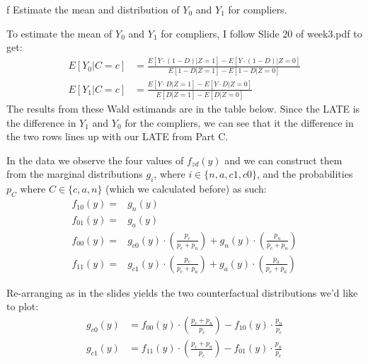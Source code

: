 \documentclass{article}
\begin{document}
\begin{problem}{f}
Estimate the mean and distribution of $Y_{0}$ and $Y_{1}$ for compliers.
\end{problem}
\begin{solution}
To estimate the mean of $Y_0$ and $Y_1$ for compliers, I follow Slide 20 of week3.pdf to get:
\begin{align*}
    E[Y_0|C=c] &= \frac{ E[ Y \cdot (1-D) | Z=1] - E[Y \cdot (1-D) | Z=0] }{ E[1-D|Z=1]-E[1-D|Z=0] } \\
    E[Y_1|C=c] &= \frac{ E[ Y \cdot D | Z=1] - E[Y \cdot D | Z=0] }{ E[D|Z=1]-E[D|Z=0] }
\end{align*}
The results from these Wald estimands are in the table below. Since the LATE is the difference in $Y_1$ and $Y_0$ for the compliers, we can see that it the difference in the two rows lines up with our LATE from Part C.

In the data we observe the four values of $f_{zd}(y)$ and we can construct them from the marginal distributions $g_i$, where $i \in \{n,a,c1,c0\}$, and the probabilities $p_C$ where $C \in \{c,a,n \}$ (which we calculated before) as such:
\begin{align*}
    f_{10}(y)=& g_{n}(y) \\
    f_{01}(y)=& g_{a}(y) \\
    f_{00}(y)=& g_{c0}(y) \cdot \left(\frac{p_{c}}{p_{c}+p_{n}}\right) 
        + g_{n}(y) \cdot \left( \frac{p_{n}}{p_{c}+p_{n}} \right) \\
    f_{11}(y)=& g_{c 1}(y) \cdot \left(\frac{p_{c}}{p_{c}+p_{a}} \right) 
        + g_{a}(y) \cdot \left(\frac{p_{a}}{p_{c}+p_{a}} \right)
\end{align*}

Re-arranging as in the slides yields the two counterfactual distributions we'd like to plot:
\begin{align*}
    g_{c0}(y) &= f_{00}(y) \cdot \left(\frac{p_{c}+p_{n}}{p_{c}}\right) - f_{10}(y) \cdot \frac{p_{n}}{p_{c}} \\
    g_{c1}(y) &= f_{11}(y) \cdot \left(\frac{p_{c}+p_{a}}{p_{c}}\right) - f_{01}(y) \cdot \frac{p_{a}}{p_{c}}
\end{align*}


\end{solution}
\end{document}
